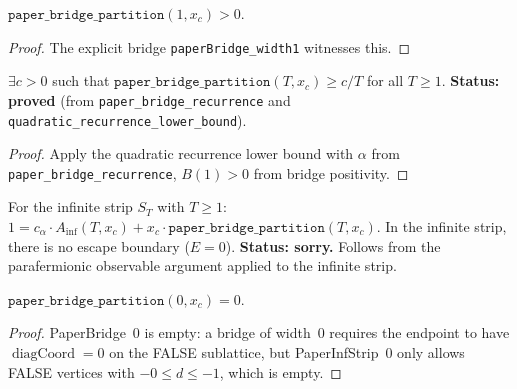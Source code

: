 \begin{lemma}\label{lem:paper_bridge_one_pos}
\leanok
{}
  $\texttt{paper\_bridge\_partition}(1, x_c) > 0$.
\end{lemma}
\begin{proof}
\leanok
  The explicit bridge \texttt{paperBridge\_width1} witnesses this.
\end{proof}

\begin{theorem}\label{thm:paper_bridge_lower}
\leanok
{}
  $\exists c > 0$ such that
  $\texttt{paper\_bridge\_partition}(T, x_c) \geq c/T$ for all $T \geq 1$.
  \textbf{Status: proved} (from \texttt{paper\_bridge\_recurrence}
  and \texttt{quadratic\_recurrence\_lower\_bound}).
\end{theorem}
\begin{proof}
\leanok
{}
  Apply the quadratic recurrence lower bound with
  $\alpha$ from \texttt{paper\_bridge\_recurrence},
  $B(1) > 0$ from bridge positivity.
\end{proof}

\begin{lemma}\label{lem:infinite_strip_identity}
  For the infinite strip $S_T$ with $T \geq 1$:
  $1 = c_\alpha \cdot A_{\inf}(T, x_c) + x_c \cdot \texttt{paper\_bridge\_partition}(T, x_c).$
  In the infinite strip, there is no escape boundary ($E = 0$).
  \textbf{Status: sorry.} Follows from the parafermionic observable
  argument applied to the infinite strip.
\end{lemma}

\begin{lemma}\label{lem:bridge_zero}
\leanok
  $\texttt{paper\_bridge\_partition}(0, x_c) = 0$.
\end{lemma}
\begin{proof}
\leanok
  PaperBridge~0 is empty: a bridge of width~0 requires the endpoint
  to have $\operatorname{diagCoord} = 0$ on the FALSE sublattice,
  but PaperInfStrip~0 only allows FALSE vertices with
  $-0 \leq d \leq -1$, which is empty.
\end{proof}

